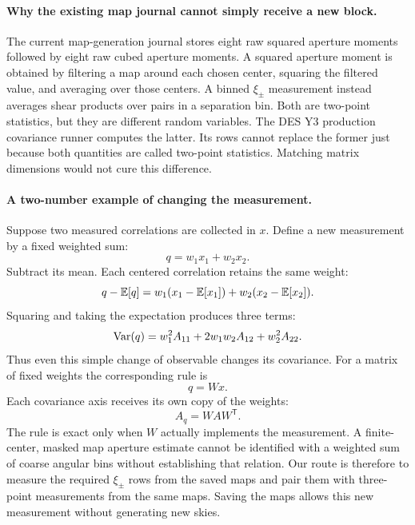 \paragraph{Why the existing map journal cannot simply receive a new block.}
The current map-generation journal stores eight raw squared aperture
moments followed by eight raw cubed aperture moments. A squared aperture
moment is obtained by filtering a map around each chosen center, squaring
the filtered value, and averaging over those centers. A binned $\xi_\pm$
measurement instead averages shear products over pairs in a separation bin.
Both are two-point statistics, but they are different random variables.
The DES Y3 production covariance runner computes the latter. Its rows cannot
replace the former just because both quantities are called two-point
statistics. Matching matrix dimensions would not cure this difference.

\paragraph{A two-number example of changing the measurement.}
Suppose two measured correlations are collected in $x$. Define a new
measurement by a fixed weighted sum:
\begin{equation}
 q=w_1x_1+w_2x_2.
\end{equation}
Subtract its mean. Each centered correlation retains the same weight:
\begin{equation}
 q-\mathbb{E}[q]=w_1(x_1-\mathbb{E}[x_1])+w_2(x_2-\mathbb{E}[x_2]).
\end{equation}
Squaring and taking the expectation produces three terms:
\begin{equation}
 \operatorname{Var}(q)=w_1^2A_{11}+2w_1w_2A_{12}+w_2^2A_{22}.
\end{equation}
Thus even this simple change of observable changes its covariance. For a
matrix of fixed weights the corresponding rule is
\begin{equation}
 q=Wx.
\end{equation}
Each covariance axis receives its own copy of the weights:
\begin{equation}
 A_q=WAW^{\mathsf T}.
\end{equation}
The rule is exact only when $W$ actually implements the measurement. A
finite-center, masked map aperture estimate cannot be identified with a
weighted sum of coarse angular bins without establishing that relation.
Our route is therefore to measure the required $\xi_\pm$ rows from the saved
maps and pair them with three-point measurements from the same maps. Saving
the maps allows this new measurement without generating new skies.

